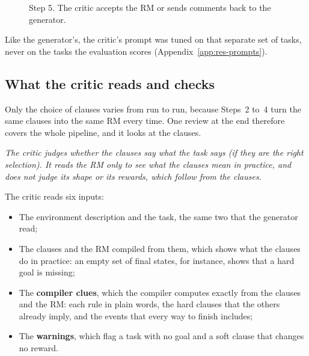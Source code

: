 \documentclass[11pt,english,listoffigures,listoftables]{tfgetsinf}
\newcommand{\keyidea}[1]{\par\smallskip\noindent\hspace*{0.6em}{\color{gray!55}\vrule width 1.5pt}\hspace{8pt}\parbox[t]{\dimexpr\linewidth-0.6em-9.5pt\relax}{\itshape #1}\par\smallskip}  %
\begin{document}
\begin{figure}[H]
\centering
{}
\caption[Step 5 of FARM]{Step 5. The critic accepts the RM or sends comments back to the generator.}
\label{fig:step5}
\end{figure}

Like the generator's, the critic's prompt was tuned on that separate set of tasks, never on the tasks the evaluation scores (Appendix~\ref{app:res-prompts}).

\subsection{What the critic reads and checks}
Only the choice of clauses varies from run to run, because Steps~2 to~4 turn the same clauses into the same RM every time. One review at the end therefore covers the whole pipeline, and it looks at the clauses.

\keyidea{The critic judges whether the clauses say what the task says (if they are the right selection). It reads the RM only to see what the clauses mean in practice, and does not judge its shape or its rewards, which follow from the clauses.}
\noindent The critic reads six inputs:
\begin{itemize}
    \item The environment description and the task, the same two that the generator read;
    \item The clauses and the RM compiled from them, which shows what the clauses do in practice: an empty set of final states, for instance, shows that a hard goal is missing;
    \item The \textbf{compiler clues}, which the compiler computes exactly from the clauses and the RM: each rule in plain words, the hard clauses that the others already imply, and the events that every way to finish includes;
    \item The \textbf{warnings}, which flag a task with no goal and a soft clause that changes no reward.
\end{itemize}
\end{document}
